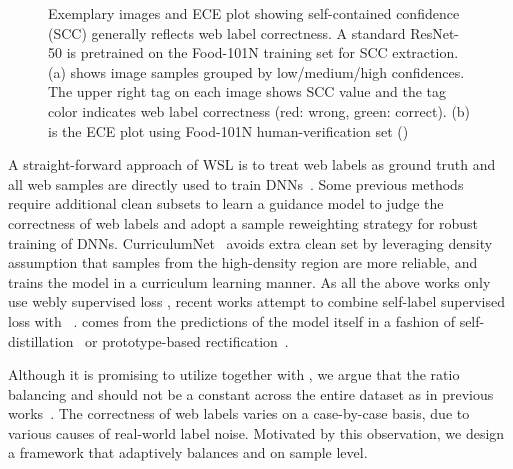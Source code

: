 \documentclass[runningheads]{llncs}
\begin{document}
\begin{figure}[t]
	\centering
{}
     \hfill
	\caption{Exemplary images and ECE plot showing self-contained confidence (SCC) generally reflects web label correctness. A standard ResNet-50 is pretrained on the Food-101N training set for SCC extraction. (a) shows image samples grouped by low/medium/high confidences. The upper right tag on each image shows SCC value and the tag color indicates web label correctness (red: wrong, green: correct). (b) is the ECE plot using Food-101N human-verification set ()}
	\label{fig:into}
\end{figure}

A straight-forward approach of WSL is to treat web labels as ground truth and all web samples are directly used to train DNNs~\cite{mahajan2018exploring,sun2017revisiting}. 
Some previous methods~\cite{jiang2018mentornet,lee2018cleannet} require additional clean subsets to learn a guidance model to judge the correctness of web labels and adopt a sample reweighting strategy for robust training of DNNs.
CurriculumNet~\cite{guo2018curriculumnet} avoids extra clean set by leveraging density assumption that samples from the high-density region are more reliable, and trains the model in a curriculum learning manner.
As all the above works only use webly supervised loss , recent works attempt to combine self-label supervised loss  with ~\cite{han2019deep,tanaka2018joint}.  comes from the predictions of the model itself in a fashion of self-distillation~\cite{hinton2015distilling} or prototype-based rectification~\cite{snell2017prototypical}. 

Although it is promising to utilize  together with , we argue that the ratio balancing  and  should not be a constant across the entire dataset as in previous works~\cite{han2019deep,tanaka2018joint}. The correctness of web labels varies on a case-by-case basis, due to various causes of real-world label noise. Motivated by this observation, we design a framework that adaptively balances  and  on sample level.  
\end{document}

